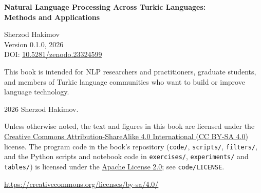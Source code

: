 \clearpage
\thispagestyle{empty}
\begingroup
\setlength{\parindent}{0pt}
\setlength{\parskip}{0.9em}
\vspace*{1.5cm}
{\large\bfseries Natural Language Processing Across Turkic Languages:\\
Methods and Applications\par}
Sherzod Hakimov\\
Version 0.1.0, 2026\\
DOI: \href{https://doi.org/10.5281/zenodo.23324599}{10.5281/zenodo.23324599}

This book is intended for NLP researchers and practitioners, graduate students, and members of Turkic language communities who want to build or improve language technology.

\vspace{1em}
\textcopyright{} 2026 Sherzod Hakimov.

Unless otherwise noted, the text and figures in this book are licensed under the \href{https://creativecommons.org/licenses/by-sa/4.0/}{Creative Commons Attribution-ShareAlike 4.0 International (CC BY-SA 4.0)} license. The program code in the book's repository (\texttt{code/}, \texttt{scripts/}, \texttt{filters/}, and the Python scripts and notebook code in \texttt{exercises/}, \texttt{experiments/} and \texttt{tables/}) is licensed under the \href{https://www.apache.org/licenses/LICENSE-2.0}{Apache License 2.0}; see \texttt{code/LICENSE}.

\url{https://creativecommons.org/licenses/by-sa/4.0/}
\endgroup
\clearpage
